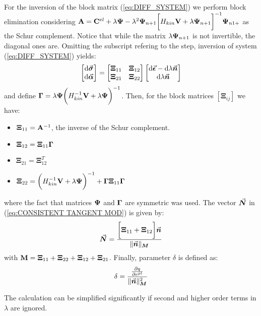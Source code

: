 \begin{appendices}
For the inversion of the block matrix (\ref{eq:DIFF_SYSTEM}) we perform block
elimination considering $\mathbf{A} =
\mathbf{C}^{el}+\lambda\mathbf{\Psi}-
\lambda 
^2\mathbf{\Psi}_{n+1}\bigg[H_{kin}\mathbf{V}+\lambda\mathbf{\Psi}_{n+1}\bigg]^{-1}\mathbf{\Psi}_{n1+}$
as
the Schur complement. Notice that while the matrix
$\lambda\mathbf{\Psi}_{n+1}$ is not invertible, the diagonal ones are.
Omitting the subscript refering to the step, inversion of 
system (\ref{eq:DIFF_SYSTEM}) yields:
\begin{equation}
	\begin{bmatrix}
		\text{d}\vec{\boldsymbol{\sigma}}\\
		\text{d}\vec{\boldsymbol{\alpha}}
	\end{bmatrix} = \begin{bmatrix}
		\bm{\Xi}_{11} &  \bm{\Xi}_{12}\\
		\bm{\Xi}_{21} &  \bm{\Xi}_{22}\\
	\end{bmatrix}\begin{bmatrix}
		\text{d}\vec{\boldsymbol{\epsilon}}-\text{d}\lambda\vec{\boldsymbol{n}}\\
		\text{d}\lambda\vec{\boldsymbol{n}}\\
	\end{bmatrix}
	\label{eq:INVERSE_SYS}
\end{equation}
and define $\mathbf{\Gamma} = 
\lambda\mathbf{\Psi}\bigg(H_{kin}^{-1}\mathbf{V}+\lambda\mathbf{\Psi}\bigg)^{-1}$.
Then, 
for the block matrices $[\bm{\Xi}_{ij}]$ we have:
\begin{itemize}
	\item $\bm{\Xi}_{11} = \mathbf{A}^{-1}$, the inverse of the Schur 
	complement.
	\item $\bm{\Xi}_{12} = \bm{\Xi}_{11}\mathbf{\Gamma}$
	\item $\bm{\Xi}_{21} = \bm{\Xi}_{12}^T$
	\item $\bm{\Xi}_{22} = 
	\bigg(H_{kin}^{-1}\mathbf{V}+\lambda\mathbf{\Psi}\bigg)^{-1} + 
	\mathbf{\Gamma}\bm{\Xi}_{11}\mathbf{\Gamma}$
\end{itemize}
\noindent where the fact that matrices $\mathbf{\Psi}$ and $\mathbf{\Gamma}$ are 
symmetric was used.
The vector $\vec{\boldsymbol{N}}$ in (\ref{eq:CONSISTENT TANGENT MOD}) is given by:
\begin{equation}
	\vec{\boldsymbol{N}} = \frac{\bigg[\bm{\Xi}_{11} + 
		\bm{\Xi}_{12}\bigg]\vec{\boldsymbol{n}}}{\Vert\vec{\boldsymbol{n}} \Vert_{\bm{M}}}
	\label{eq:NORMAL_N}
\end{equation}
\noindent with $\mathbf{M} = \bm{\Xi}_{11} + \bm{\Xi}_{22} + \bm{\Xi}_{12}
+ \bm{\Xi}_{21}$. Finally, parameter $\delta$ is defined as:
\begin{equation}
	\delta = \frac{\frac{\partial q}{\partial 
			e^{pl}}}{\Vert\vec{\boldsymbol{n}} \Vert^2_{\bm{M}}}
\end{equation}

The calculation can be simplified significantly if second and higher order 
terms in $\lambda$ are ignored.

\end{appendices}